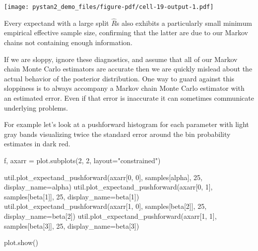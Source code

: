 \documentclass[
  letterpaper,
  DIV=11,
  numbers=noendperiod]{scrartcl}
\newenvironment{Shaded}{\begin{snugshade}}{\end{snugshade}}
\newcommand{\DecValTok}[1]{\textcolor[rgb]{0.68,0.00,0.00}{#1}}
\newcommand{\NormalTok}[1]{\textcolor[rgb]{0.00,0.23,0.31}{#1}}
\newcommand{\OperatorTok}[1]{\textcolor[rgb]{0.37,0.37,0.37}{#1}}
\newcommand{\StringTok}[1]{\textcolor[rgb]{0.13,0.47,0.30}{#1}}
\begin{document}
\texttt{[image: pystan2\_demo\_files/figure-pdf/cell-19-output-1.pdf]}

Every expectand with a large split \(\hat{R}\)s also exhibits a
particularly small minimum empirical effective sample size, confirming
that the latter are due to our Markov chains not containing enough
information.

If we are sloppy, ignore these diagnostics, and assume that all of our
Markov chain Monte Carlo estimators are accurate then we are quickly
mislead about the actual behavior of the posterior distribution. One way
to guard against this sloppiness is to always accompany a Markov chain
Monte Carlo estimator with an estimated error. Even if that error is
inaccurate it can sometimes communicate underlying problems.

For example let's look at a pushforward histogram for each parameter
with light gray bands visualizing twice the standard error around the
bin probability estimates in dark red.

\begin{Shaded}
\begin{Highlighting}[]
\NormalTok{f, axarr }\OperatorTok{=}\NormalTok{ plot.subplots(}\DecValTok{2}\NormalTok{, }\DecValTok{2}\NormalTok{, layout}\OperatorTok{=}\StringTok{"constrained"}\NormalTok{)}

\NormalTok{util.plot\_expectand\_pushforward(axarr[}\DecValTok{0}\NormalTok{, }\DecValTok{0}\NormalTok{], samples[}\StringTok{\textquotesingle{}alpha\textquotesingle{}}\NormalTok{], }
                                \DecValTok{25}\NormalTok{, display\_name}\OperatorTok{=}\StringTok{\textquotesingle{}alpha\textquotesingle{}}\NormalTok{)}
\NormalTok{util.plot\_expectand\_pushforward(axarr[}\DecValTok{0}\NormalTok{, }\DecValTok{1}\NormalTok{], samples[}\StringTok{\textquotesingle{}beta[1]\textquotesingle{}}\NormalTok{], }
                                \DecValTok{25}\NormalTok{, display\_name}\OperatorTok{=}\StringTok{\textquotesingle{}beta[1]\textquotesingle{}}\NormalTok{)}
\NormalTok{util.plot\_expectand\_pushforward(axarr[}\DecValTok{1}\NormalTok{, }\DecValTok{0}\NormalTok{], samples[}\StringTok{\textquotesingle{}beta[2]\textquotesingle{}}\NormalTok{], }
                                \DecValTok{25}\NormalTok{, display\_name}\OperatorTok{=}\StringTok{\textquotesingle{}beta[2]\textquotesingle{}}\NormalTok{)}
\NormalTok{util.plot\_expectand\_pushforward(axarr[}\DecValTok{1}\NormalTok{, }\DecValTok{1}\NormalTok{], samples[}\StringTok{\textquotesingle{}beta[3]\textquotesingle{}}\NormalTok{], }
                                \DecValTok{25}\NormalTok{, display\_name}\OperatorTok{=}\StringTok{\textquotesingle{}beta[3]\textquotesingle{}}\NormalTok{)}

\NormalTok{plot.show()}
\end{Highlighting}
\end{Shaded}
\end{document}
